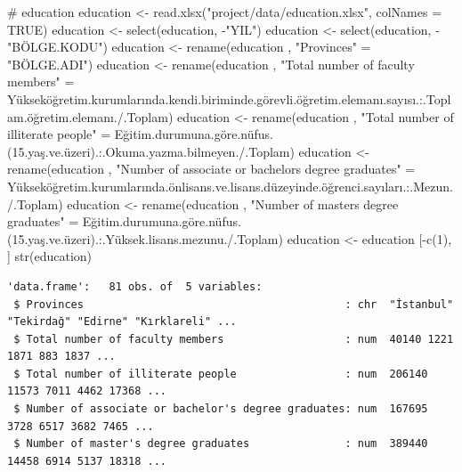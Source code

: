 \documentclass[
  11pt,
  a4paper,
  DIV=11,
  numbers=noendperiod]{scrartcl}
\newenvironment{Shaded}{\begin{snugshade}}{\end{snugshade}}
\newcommand{\AttributeTok}[1]{\textcolor[rgb]{0.40,0.45,0.13}{#1}}
\newcommand{\CommentTok}[1]{\textcolor[rgb]{0.37,0.37,0.37}{#1}}
\newcommand{\ConstantTok}[1]{\textcolor[rgb]{0.56,0.35,0.01}{#1}}
\newcommand{\DecValTok}[1]{\textcolor[rgb]{0.68,0.00,0.00}{#1}}
\newcommand{\FunctionTok}[1]{\textcolor[rgb]{0.28,0.35,0.67}{#1}}
\newcommand{\NormalTok}[1]{\textcolor[rgb]{0.00,0.23,0.31}{#1}}
\newcommand{\OtherTok}[1]{\textcolor[rgb]{0.00,0.23,0.31}{#1}}
\newcommand{\SpecialCharTok}[1]{\textcolor[rgb]{0.37,0.37,0.37}{#1}}
\newcommand{\StringTok}[1]{\textcolor[rgb]{0.13,0.47,0.30}{#1}}
\begin{document}
\begin{Shaded}
\begin{Highlighting}[]
\CommentTok{\# education}
\NormalTok{education }\OtherTok{\textless{}{-}} \FunctionTok{read.xlsx}\NormalTok{(}\StringTok{"project/data/education.xlsx"}\NormalTok{, }\AttributeTok{colNames =} \ConstantTok{TRUE}\NormalTok{)}
\NormalTok{education }\OtherTok{\textless{}{-}} \FunctionTok{select}\NormalTok{(education, }\SpecialCharTok{{-}}\StringTok{"YIL"}\NormalTok{)  }
\NormalTok{education }\OtherTok{\textless{}{-}} \FunctionTok{select}\NormalTok{(education, }\SpecialCharTok{{-}}\StringTok{"BÖLGE.KODU"}\NormalTok{)}
\NormalTok{education  }\OtherTok{\textless{}{-}} \FunctionTok{rename}\NormalTok{(education , }\StringTok{"Provinces"} \OtherTok{=} \StringTok{"BÖLGE.ADI"}\NormalTok{)}
\NormalTok{education  }\OtherTok{\textless{}{-}} \FunctionTok{rename}\NormalTok{(education , }\StringTok{"Total number of faculty members"} \OtherTok{=} \StringTok{\textasciigrave{}}\AttributeTok{Yükseköğretim.kurumlarında.kendi.biriminde.görevli.öğretim.elemanı.sayısı.:.Toplam.öğretim.elemanı./.Toplam}\StringTok{\textasciigrave{}}\NormalTok{)}
\NormalTok{education  }\OtherTok{\textless{}{-}} \FunctionTok{rename}\NormalTok{(education , }\StringTok{"Total number of illiterate people"} \OtherTok{=} \StringTok{\textasciigrave{}}\AttributeTok{Eğitim.durumuna.göre.nüfus.(15.yaş.ve.üzeri).:.Okuma.yazma.bilmeyen./.Toplam}\StringTok{\textasciigrave{}}\NormalTok{)}
\NormalTok{education  }\OtherTok{\textless{}{-}} \FunctionTok{rename}\NormalTok{(education , }\StringTok{"Number of associate or bachelor\textquotesingle{}s degree graduates"} \OtherTok{=} \StringTok{\textasciigrave{}}\AttributeTok{Yükseköğretim.kurumlarında.önlisans.ve.lisans.düzeyinde.öğrenci.sayıları.:.Mezun./.Toplam}\StringTok{\textasciigrave{}}\NormalTok{)}
\NormalTok{education  }\OtherTok{\textless{}{-}} \FunctionTok{rename}\NormalTok{(education , }\StringTok{"Number of master\textquotesingle{}s degree graduates"} \OtherTok{=} \StringTok{\textasciigrave{}}\AttributeTok{Eğitim.durumuna.göre.nüfus.(15.yaş.ve.üzeri).:.Yüksek.lisans.mezunu./.Toplam}\StringTok{\textasciigrave{}}\NormalTok{)}
\NormalTok{education }\OtherTok{\textless{}{-}}\NormalTok{ education [}\SpecialCharTok{{-}}\FunctionTok{c}\NormalTok{(}\DecValTok{1}\NormalTok{), ]}
\FunctionTok{str}\NormalTok{(education)}
\end{Highlighting}
\end{Shaded}

\begin{verbatim}
'data.frame':   81 obs. of  5 variables:
 $ Provinces                                         : chr  "İstanbul" "Tekirdağ" "Edirne" "Kırklareli" ...
 $ Total number of faculty members                   : num  40140 1221 1871 883 1837 ...
 $ Total number of illiterate people                 : num  206140 11573 7011 4462 17368 ...
 $ Number of associate or bachelor's degree graduates: num  167695 3728 6517 3682 7465 ...
 $ Number of master's degree graduates               : num  389440 14458 6914 5137 18318 ...
\end{verbatim}
\end{document}
